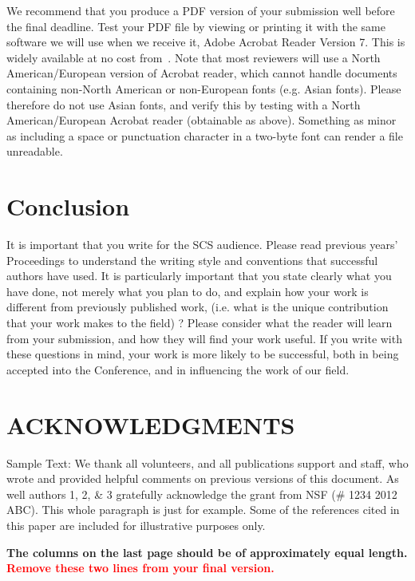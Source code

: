 \documentclass{scsSimAUDPaperFormat}
\begin{document}
We recommend that you produce a PDF version of your submission well
before the final deadline. Test your PDF file by viewing or printing it with the same software we
will use when we receive it, Adobe Acrobat Reader Version 7. This is
widely available at no cost from~\cite{acrobat}. Note that most
reviewers will use a North American/European version of Acrobat
reader, which cannot handle documents containing non-North American or
non-European fonts (e.g. Asian fonts). Please therefore do not use
Asian fonts, and verify this by testing with a North American/European
Acrobat reader (obtainable as above). Something as minor as including
a space or punctuation character in a two-byte font can render a file
unreadable.

\section{Conclusion}

It is important that you write for the SCS audience. Please read previous years’ Proceedings to understand the writing style and conventions that successful authors have used. It is particularly important that you state clearly what you have done, not merely what you plan to do, and explain how your work is different from previously published work, (i.e. what is the unique contribution that your work makes to the field) ? Please consider what the reader will learn from your submission, and how they will find your work useful. If you write with these questions in mind, your work is more likely to be successful, both in being accepted into the Conference, and in influencing the work of our field.

\section*{ACKNOWLEDGMENTS}

Sample Text: We thank all volunteers, and all publications support and staff, who wrote and provided helpful comments on previous versions of this document. As well authors 1, 2, \& 3 gratefully acknowledge the grant from NSF (\# 1234 2012 ABC). This whole paragraph is just for example. Some of the references cited in this paper are included for illustrative purposes only.


\balance

%
%
%
%




\centering
\large\bf The columns on the last page should be of approximately equal length.
\textcolor{red}{Remove these two lines from your final version.}
\end{document}
